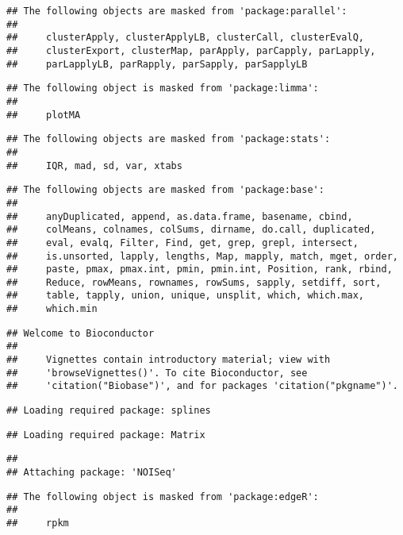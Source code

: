 \documentclass[]{article}
\begin{document}
\begin{verbatim}
## The following objects are masked from 'package:parallel':
## 
##     clusterApply, clusterApplyLB, clusterCall, clusterEvalQ,
##     clusterExport, clusterMap, parApply, parCapply, parLapply,
##     parLapplyLB, parRapply, parSapply, parSapplyLB
\end{verbatim}

\begin{verbatim}
## The following object is masked from 'package:limma':
## 
##     plotMA
\end{verbatim}

\begin{verbatim}
## The following objects are masked from 'package:stats':
## 
##     IQR, mad, sd, var, xtabs
\end{verbatim}

\begin{verbatim}
## The following objects are masked from 'package:base':
## 
##     anyDuplicated, append, as.data.frame, basename, cbind,
##     colMeans, colnames, colSums, dirname, do.call, duplicated,
##     eval, evalq, Filter, Find, get, grep, grepl, intersect,
##     is.unsorted, lapply, lengths, Map, mapply, match, mget, order,
##     paste, pmax, pmax.int, pmin, pmin.int, Position, rank, rbind,
##     Reduce, rowMeans, rownames, rowSums, sapply, setdiff, sort,
##     table, tapply, union, unique, unsplit, which, which.max,
##     which.min
\end{verbatim}

\begin{verbatim}
## Welcome to Bioconductor
## 
##     Vignettes contain introductory material; view with
##     'browseVignettes()'. To cite Bioconductor, see
##     'citation("Biobase")', and for packages 'citation("pkgname")'.
\end{verbatim}

\begin{verbatim}
## Loading required package: splines
\end{verbatim}

\begin{verbatim}
## Loading required package: Matrix
\end{verbatim}

\begin{verbatim}
## 
## Attaching package: 'NOISeq'
\end{verbatim}

\begin{verbatim}
## The following object is masked from 'package:edgeR':
## 
##     rpkm
\end{verbatim}
\end{document}
